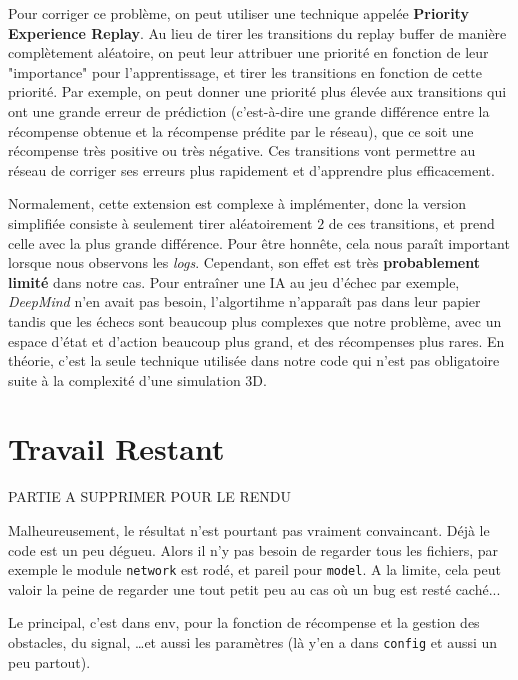 \documentclass{article}
\begin{document}
\vspace{0.5cm}

Pour corriger ce problème, on peut utiliser une technique appelée \textbf{Priority Experience Replay}.
Au lieu de tirer les transitions du replay buffer de manière complètement aléatoire, 
on peut leur attribuer une priorité en fonction de leur "importance" pour l'apprentissage, 
et tirer les transitions en fonction de cette priorité. 
Par exemple, on peut donner une priorité plus élevée aux transitions qui ont une grande erreur 
de prédiction (c'est-à-dire une grande différence entre la récompense obtenue et la récompense prédite par le réseau),
que ce soit une récompense très positive ou très négative.
Ces transitions vont permettre au réseau de corriger ses erreurs plus rapidement et d'apprendre plus efficacement.

\vspace{0.5cm}

Normalement, cette extension est complexe à implémenter, donc la version simplifiée
consiste à seulement tirer aléatoirement $2$ de ces transitions,
et prend celle avec la plus grande différence. Pour être honnête,
cela nous paraît important lorsque nous observons les \textit{logs}.
Cependant, son effet est très \textbf{probablement limité} dans notre cas.
Pour entraîner une IA au jeu d'échec par exemple, \textit{DeepMind} n'en avait pas besoin, l'algortihme n'apparaît pas dans leur papier
tandis que les échecs sont beaucoup plus complexes que notre problème, avec un espace d'état et d'action beaucoup plus grand, et des récompenses plus rares.
En théorie, c'est la seule technique utilisée dans notre code qui n'est pas obligatoire suite
à la complexité d'une simulation 3D.

\section{Travail Restant}

PARTIE A SUPPRIMER POUR LE RENDU

Malheureusement, le résultat n'est pourtant pas vraiment convaincant.
Déjà le code est un peu dégueu. Alors il n'y  pas besoin de regarder tous les fichiers,
par exemple le module \texttt{network} est rodé, et pareil pour \texttt{model}. A la limite,
cela peut valoir la peine de regarder une tout petit peu au cas où un bug est resté caché...

\vspace{0.5cm}

Le principal, c'est dans env, pour la fonction de récompense et la gestion des obstacles,
 du signal, \dots et aussi les paramètres 
(là y'en a dans \texttt{config} et aussi un peu partout).
\end{document}
